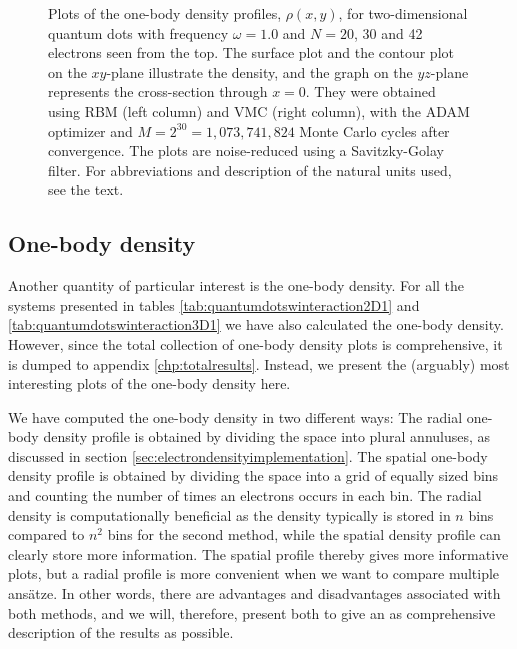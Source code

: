 \begin{figure}
	\caption{Plots of the one-body density profiles, $\rho(x,y)$, for two-dimensional quantum dots with frequency $\omega=1.0$ and $N=20$, 30 and 42 electrons seen from the top. The surface plot and the contour plot on the $xy$-plane illustrate the density, and the graph on the $yz$-plane represents the cross-section through $x=0$. They were obtained using RBM (left column) and VMC (right column), with the ADAM optimizer and $M=2^{30}=1,073,741,824$ Monte Carlo cycles after convergence. The plots are noise-reduced using a Savitzky-Golay filter. For abbreviations and description of the natural units used, see the text.}
	\label{fig:OB_interaction_1p0w2}
\end{figure}

\subsection{One-body density} \label{sec:onebodyresults}
Another quantity of particular interest is the one-body density. For all the systems presented in tables \eqref{tab:quantumdotswinteraction2D1} and \eqref{tab:quantumdotswinteraction3D1} we have also calculated the one-body density. However, since the total collection of one-body density plots is comprehensive, it is dumped to appendix \ref{chp:totalresults}. Instead, we present the (arguably) most interesting plots of the one-body density here. 

We have computed the one-body density in two different ways: The radial one-body density profile is obtained by dividing the space into plural annuluses, as discussed in section \ref{sec:electrondensityimplementation}. The spatial one-body density profile is obtained by dividing the space into a grid of equally sized bins and counting the number of times an electrons occurs in each bin. The radial density is computationally beneficial as the density typically is stored in $n$ bins compared to $n^2$ bins for the second method, while the spatial density profile can clearly store more information. The spatial profile thereby gives more informative plots, but a radial profile is more convenient when we want to compare multiple ansätze. In other words, there are advantages and disadvantages associated with both methods, and we will, therefore, present both to give an as comprehensive description of the results as possible. 

